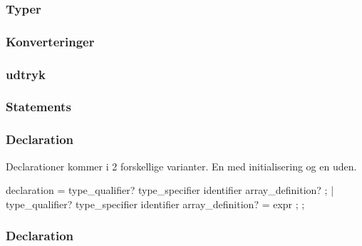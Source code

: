 \subsubsection{Typer}







\subsubsection{Konverteringer}




\subsubsection{udtryk}








\subsubsection{Statements}



\subsubsection{Declaration}
Declarationer kommer i 2 forskellige varianter. En med initialisering og en uden.

declaration =
	type_qualifier? type_specifier identifier array_definition? ;											
  | type_qualifier? type_specifier identifier array_definition? = expr ;
;


\subsubsection{Declaration}


\subsubsection{}